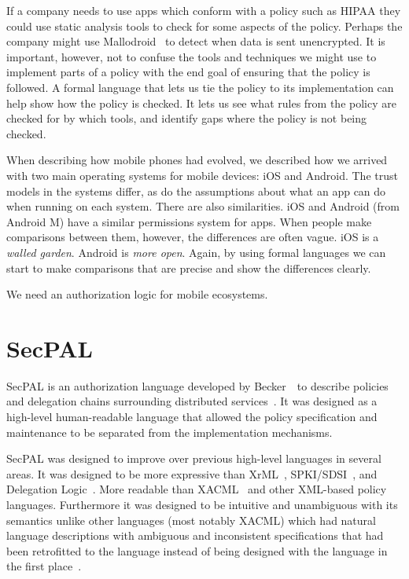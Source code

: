 \documentclass[thesis.tex]{subfiles}
\begin{document}
If a company needs to use apps which conform with a policy such as
\ac{HIPAA} they could use static analysis tools to check for some
aspects of the policy.  Perhaps the company might use
Mallodroid~\cite{fahl_why_2012} to detect when data is sent
unencrypted.  It is important, however, not to confuse the tools and
techniques we might use to implement parts of a policy with the end
goal of ensuring that the policy is followed.  A formal language that
lets us tie the policy to its implementation can help show how the
policy is checked.  It lets us see what rules from the policy are
checked for by which tools, and identify gaps where the policy is not
being checked.

When describing how mobile phones had evolved, we described how we
arrived with two main operating systems for mobile devices: iOS and
Android.  The trust models in the systems differ, as do the
assumptions about what an app can do when running on each system.
There are also similarities.  iOS and Android (from Android M) have a
similar permissions system for apps.  When people make comparisons
between them, however, the differences are often vague.  iOS is a
\emph{walled garden}.  Android is \emph{more open}.  Again, by using
formal languages we can start to make comparisons that are precise and
show the differences clearly.

We need an authorization logic for mobile ecosystems.

\section{SecPAL}

SecPAL is an authorization language developed by Becker~\etal~to
describe policies and delegation chains surrounding distributed
services~\cite{becker_secpal:_2010}. It was designed as a high-level
human-readable language that allowed the policy specification and
maintenance to be separated from the implementation mechanisms.

SecPAL was designed to improve over previous high-level languages in
several areas.  It was designed to be more expressive than
XrML~\cite{kolovski_logic-based_2007},
SPKI/SDSI~\cite{ellison_spki_1999}, and Delegation
Logic~\cite{li_delegation_2003}. More readable than
XACML~\cite{oasis_extensible_2013} and other XML-based policy
languages.  Furthermore it was designed to be intuitive and
unambiguous with its semantics unlike other languages (most notably
XACML) which had natural language descriptions with ambiguous and
inconsistent specifications that had been retrofitted to the language
instead of being designed with the language in the first
place~\cite{bryans_reasoning_2005,ramli_logic_2014,masi_formalisation_2012}.
\end{document}
